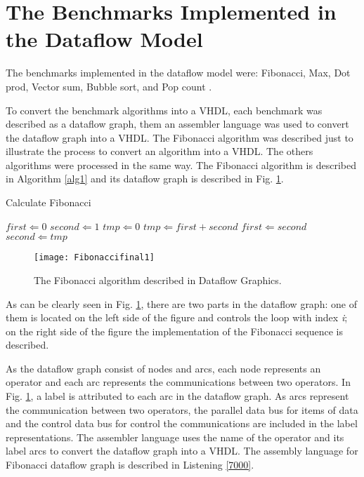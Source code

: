 \documentclass[preprint,12pt]{elsarticle}
\begin{document}
\section{The Benchmarks Implemented in the Dataflow Model}\label{l3}

The benchmarks implemented in the dataflow model were: Fibonacci, Max, Dot prod, Vector sum, Bubble sort, and Pop count \cite{r83}.

To convert the benchmark algorithms into a VHDL, each benchmark was described as a dataflow graph, them an assembler language was used to convert the dataflow graph into a VHDL. The Fibonacci algorithm was described just to illustrate the process to convert an algorithm into a VHDL. The others algorithms were processed in the same way. The Fibonacci algorithm is described in Algorithm \ref{alg1} and its dataflow graph is described in Fig. \ref{f7}.


\begin{algorithm}
\caption{Calculate Fibonacci}
\label{alg1}
\begin{algorithmic}
\STATE $first \Leftarrow 0$
\STATE $second \Leftarrow 1$
\STATE $tmp \Leftarrow 0$
\STATE $tmp \Leftarrow first + second$
\STATE $first \Leftarrow second$
\STATE $second \Leftarrow tmp$
\ENDFOR
\end{algorithmic}
\end{algorithm}

\begin{figure}[h]
\begin{center}
   \texttt{[image: Fibonaccifinal1]}
   \caption{The Fibonacci algorithm described in Dataflow Graphics.} \label{f7}
\end{center}
\end{figure}


As can be clearly seen in Fig. \ref{f7}, there are two parts in the dataflow graph: one of them is located on the left side of the figure and controls the loop with index {\it i}; on the right side of the figure the implementation of the Fibonacci sequence is described.

As the dataflow graph consist of nodes and arcs, each node represents an operator and each arc represents the communications between two operators. In Fig. \ref{f7}, a label is attributed to each arc in the dataflow graph. As arcs represent the communication between two operators, the parallel data bus for items of data and the control data bus for control the communications are included in the label representations. The assembler language uses the name of the operator and its label arcs to convert the dataflow graph into a VHDL. The assembly language for Fibonacci dataflow graph is described in Listening \ref{7000}.
\end{document}

